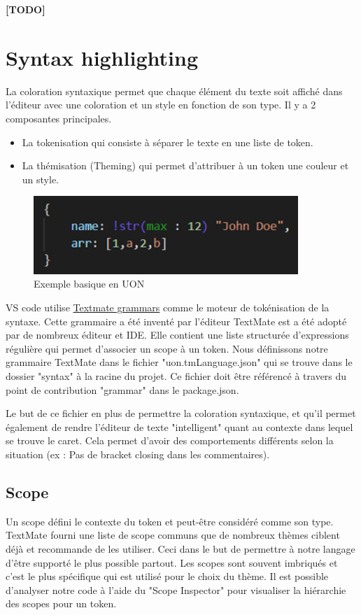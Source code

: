 \documentclass[
    iict, %
    il, %
]{heig-tb}
\begin{document}
\textbf{[TODO]}

\section{Syntax highlighting}
La coloration syntaxique permet que chaque élément du texte soit affiché dans l'éditeur avec une coloration et un style en fonction de son type.
Il y a 2 composantes principales.
\begin{itemize}
    \item La tokenisation qui consiste à séparer le texte en une liste de token.
    \item La thémisation (Theming) qui permet d'attribuer à un token une couleur et un style.
\end{itemize}

\begin{figure}[!ht]
    \begin{center}
        \includegraphics[width=10cm]{assets/figures/basic-uon.png}
    \end{center}
    \caption[code UON]{\label{basic-uon} Exemple basique en UON}
\end{figure}


VS code utilise \href{https://macromates.com/manual/en/language_grammars}{Textmate grammars} comme le moteur de tokénisation de la syntaxe.
Cette grammaire a été inventé par l'éditeur TextMate est a été adopté par de nombreux éditeur et IDE.
Elle contient une liste structurée d'expressions régulière qui permet d'associer un scope à un token.
Nous définissons notre grammaire TextMate dans le fichier "uon.tmLanguage.json" qui  se trouve dans le dossier "syntax" à la racine du projet.
Ce fichier doit être référencé à travers du point de contribution "grammar" dans le package.json.

Le but de ce fichier en plus de permettre la coloration syntaxique, et qu'il permet également de rendre l'éditeur de texte "intelligent" quant au contexte dans lequel se trouve le caret. Cela permet d'avoir des comportements différents selon la situation (ex : Pas de bracket closing dans les commentaires).

\subsection{Scope}
Un scope défini le contexte du token et peut-être considéré comme son type.
TextMate fourni une liste de scope communs que de nombreux thèmes ciblent déjà et recommande de les utiliser. Ceci dans le but de permettre à notre langage d'être supporté le plus possible partout.
Les scopes sont souvent imbriqués et c'est le plus spécifique qui est utilisé pour le choix du thème.
Il est possible d'analyser notre code à l'aide du "Scope Inspector" pour visualiser la hiérarchie des scopes pour un token.
\end{document}

